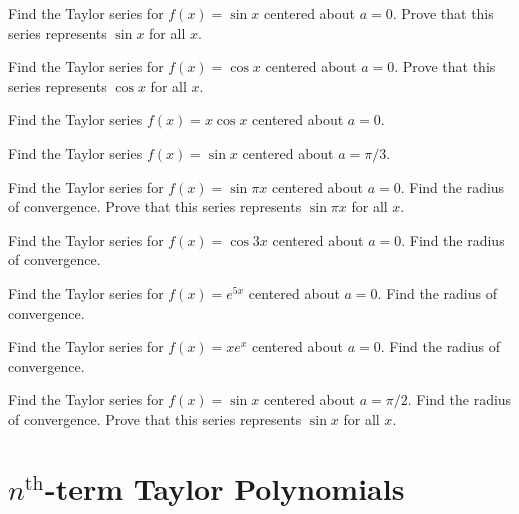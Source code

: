 \begin{exercise}
Find the Taylor series for $f(x) = \sin x$ centered about $a = 0$. Prove that this series represents $\sin x$ for all $x$.
\end{exercise}

\begin{exercise}
Find the Taylor series for $f(x) = \cos x$ centered about $a = 0$. Prove that this series represents $\cos x$ for all $x$.
\end{exercise}

\begin{exercise}
Find the Taylor series $f(x) = x \cos x$ centered about $a = 0$.
\end{exercise}

\begin{exercise}
Find the Taylor series $f(x) = \sin x$ centered about $a = \pi/3$.
\end{exercise}

\begin{exercise}
Find the Taylor series for $f(x) = \sin \pi x$ centered about $a = 0$. Find the radius of convergence. Prove that this series represents $\sin \pi x$ for all $x$.
\end{exercise}

\begin{exercise}
Find the Taylor series for $f(x) = \cos 3x$ centered about $a = 0$. Find the radius of convergence.
\end{exercise}

\begin{exercise}
Find the Taylor series for $f(x) = e^{5x}$ centered about $a = 0$. Find the radius of convergence.
\end{exercise}

\begin{exercise}
Find the Taylor series for $f(x) = xe^{x}$ centered about $a = 0$. Find the radius of convergence.
\end{exercise}

\begin{exercise}
Find the Taylor series for $f(x) = \sin x$ centered about $a = \pi/2$. Find the radius of convergence. Prove that this series represents $\sin x$ for all $x$.
\end{exercise}

\newpage
\section{$n^{\text{th}}$-term Taylor Polynomials}

